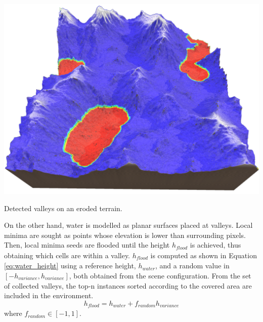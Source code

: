 \begin{marginfigure}[2.5cm]
    \centering
    \includegraphics[width=\linewidth]{figs/lidar_simulation/valley_finds.png}
	\caption{Detected valleys on an eroded terrain. }
	\label{fig:terrain_valleys}
\end{marginfigure}
On the other hand, water is modelled as planar surfaces placed at valleys. Local minima are sought as points whose elevation is lower than surrounding pixels. Then, local minima seeds are flooded until the height $h_{\textit{flood}}$ is achieved, thus obtaining which cells are within a valley. $h_{\textit{flood}}$ is computed as shown in Equation \ref{eq:water_height} using a reference height, $h_{\textit{water}}$, and a random value in $[-h_{\textit{variance}}, h_{\textit{variance}}]$, both obtained from the scene configuration. From the set of collected valleys, the top-n instances sorted according to the covered area are included in the environment. 
\begin{equation}
    \label{eq:water_height}
    h_{\textit{flood}} = h_{\textit{water}} + f_{\textit{random}}h_{\textit{variance}}
\end{equation}
where $f_{\textit{random}} \in [-1, 1]$.

